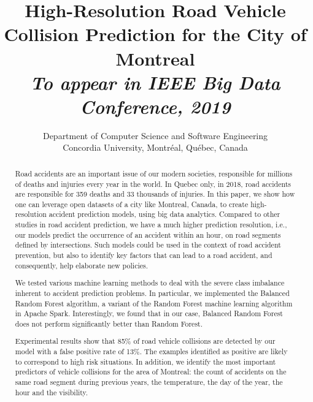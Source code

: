 \documentclass[conference]{IEEEtran}
\begin{document}
\title{High-Resolution Road Vehicle Collision Prediction for the City of Montreal \\
{\normalsize \color{blue} \textit{To appear in IEEE Big Data Conference, 2019}}}
\author{
Department of Computer Science and Software Engineering \\
Concordia University, Montréal, Québec, Canada
}

\maketitle

\begin{abstract}

Road accidents are an important issue of our modern societies, responsible
for millions of deaths and injuries every year in the world. In Quebec only,
in 2018, road accidents are responsible for 359 deaths and 33 thousands of injuries.
In this paper, we show how one can leverage open datasets of a city like
Montreal, Canada, to create high-resolution accident prediction models, using
big data analytics.
Compared to other studies in road accident prediction, we have a much higher
prediction resolution, i.e., our models predict the occurrence of an accident
within an hour, on road segments defined by intersections.
Such models could be used in the context of road accident prevention, but also
to identify key factors that can lead to a road accident, and consequently, help
elaborate new policies.

We tested various machine learning methods to deal with the severe class imbalance inherent
to accident prediction problems. In particular, we implemented the Balanced Random Forest algorithm, a variant
of the Random Forest machine learning algorithm in Apache Spark. 
Interestingly, we found that in our case,
Balanced Random Forest does not perform significantly better than Random Forest.

Experimental results show that 85\% of road vehicle collisions are detected by our model with a false positive rate of 13\%. The examples identified as positive are likely to correspond to high risk situations.
In addition, we identify the most important predictors of vehicle collisions for the area of Montreal: the count of accidents on the same road segment during previous years, the temperature, the day of the year, the hour and the visibility.

\end{abstract}
\end{document}
